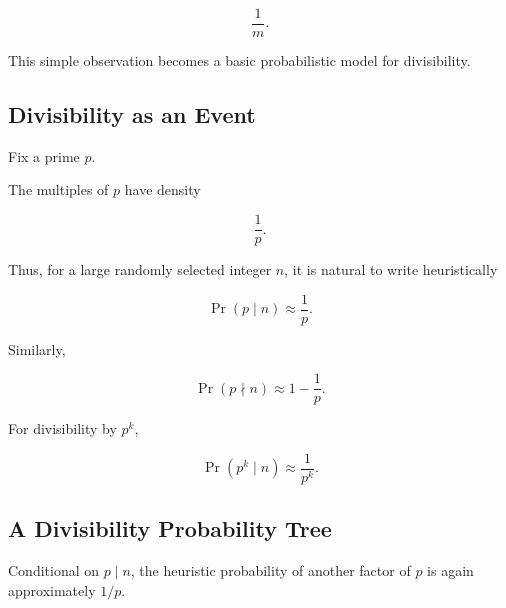\[ \boxed{\frac1m.} \]

This simple observation becomes a basic probabilistic model for divisibility.

\subsection{Divisibility as an Event}
\label{subsec:divisibility-as-event}

Fix a prime \(p\).

The multiples of \(p\) have density

\[ \frac1p. \]

Thus, for a large randomly selected integer \(n\), it is natural to write
heuristically

\[ \boxed{\Pr(p\mid n)\approx\frac1p.} \]

Similarly,

\[ \Pr(p\nmid n)\approx1-\frac1p. \]

For divisibility by \(p^k\),

\[ \boxed{\Pr(p^k\mid n)\approx\frac1{p^k}.} \]

\subsection{A Divisibility Probability Tree}
\label{subsec:divisibility-probability-tree}

\begin{centereddiagram}
\end{centereddiagram}

Conditional on \(p\mid n\), the heuristic probability of another factor of
\(p\) is again approximately \(1/p\).

